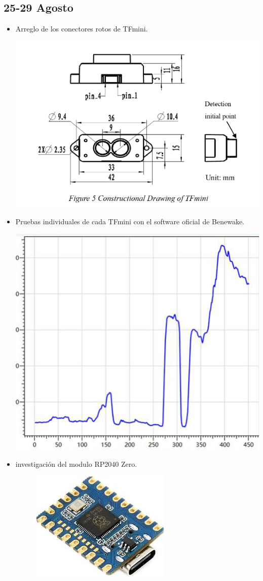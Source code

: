 \documentclass[12pt,a4paper]{article}
\begin{document}
\subsection*{25-29 Agosto}
\begin{itemize}

\item Arreglo de los conectores rotos de TFmini.

\includegraphics[width=0.5\linewidth]{Carpeta de campo/imagen29.png}

\item Pruebas individuales de cada TFmini con el software oficial de Benewake.

\includegraphics[width=0.5\linewidth]{Carpeta de campo/imagen30.png}

\item investigación del modulo RP2040 Zero.

\begin{figure}[H]
    \centering
    \includegraphics[width=0.5\linewidth]{Carpeta de campo/RP2040.png}
\end{figure}


\end{itemize}
\end{document}
